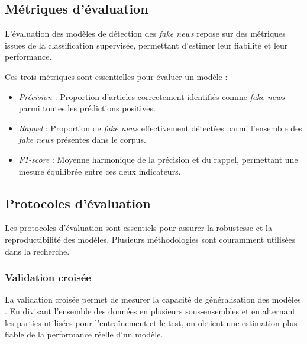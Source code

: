 \documentclass[a4paper,12pt, twocolumn]{article}
\begin{document}
\begin{twocolumn}
\subsection{Métriques d’évaluation} L’évaluation des modèles de détection des \textit{fake news} repose sur des métriques issues de la classification supervisée, permettant d’estimer leur fiabilité et leur performance.

\bigskip
Ces trois métriques sont essentielles pour évaluer un modèle : \begin{itemize} \item \textit{Précision} : Proportion d’articles correctement identifiés comme \textit{fake news} parmi toutes les prédictions positives. \item \textit{Rappel} : Proportion de \textit{fake news} effectivement détectées parmi l’ensemble des \textit{fake news} présentes dans le corpus. \item \textit{F1-score} : Moyenne harmonique de la précision et du rappel, permettant une mesure équilibrée entre ces deux indicateurs. \end{itemize}

\subsection{Protocoles d’évaluation} 
Les protocoles d’évaluation sont essentiels pour assurer la robustesse et la reproductibilité des modèles. Plusieurs méthodologies sont couramment utilisées dans la recherche.

\subsubsection{Validation croisée} 
La validation croisée permet de mesurer la capacité de généralisation des modèles \cite{truica_its_2023}. En divisant l’ensemble des données en plusieurs sous-ensembles et en alternant les parties utilisées pour l’entraînement et le test, on obtient une estimation plus fiable de la performance réelle d’un modèle.


\end{twocolumn}
\end{document}
